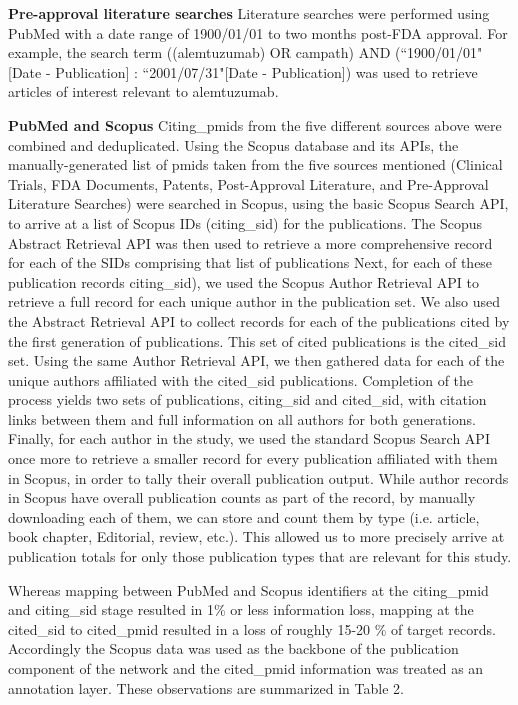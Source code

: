\documentclass[10pt,letterpaper]{article}
\begin{document}
\textbf{Pre-approval literature searches} Literature searches were performed using PubMed with a date range of 1900/01/01 to two months post-FDA approval. For example, the search term ((alemtuzumab) OR campath) AND (``1900/01/01"[Date - Publication] : ``2001/07/31"[Date - Publication]) was used to retrieve articles of interest relevant to alemtuzumab.

\textbf{PubMed and Scopus} Citing\_pmids from the five different sources above  were combined and deduplicated. Using the Scopus database and its APIs, the manually-generated list of pmids taken from the five sources mentioned (Clinical Trials, FDA Documents, Patents, Post-Approval Literature, and Pre-Approval Literature Searches) were searched in Scopus, using the basic Scopus Search API, to arrive at a list of Scopus IDs (citing\_sid) for the publications. The Scopus Abstract Retrieval API was then used to retrieve a more comprehensive record for each of the SIDs comprising that list of publications Next, for each of these publication records citing\_sid), we used the Scopus Author Retrieval API to retrieve a full record for each unique author in the  publication set. We also used the Abstract Retrieval API to collect records for each of the publications cited by the first generation of publications. This set of cited publications is the cited\_sid set.  Using the same Author Retrieval API, we then gathered data for each of the unique authors affiliated with the cited\_sid publications. Completion of the process yields two sets of publications, citing\_sid and cited\_sid, with citation links between them and full information on all authors for both generations. Finally, for each author in the study, we used the standard Scopus Search API once more to retrieve a smaller record for every publication affiliated with them in Scopus, in order to tally their overall publication output. While author records in Scopus have overall publication counts as part of the record, by manually downloading each of them, we can store and count them by type (i.e. article, book chapter, Editorial, review, etc.). This allowed us to more precisely arrive at publication totals for only those publication types that are relevant for this study. 

Whereas mapping between PubMed and Scopus identifiers at the citing\_pmid and citing\_sid stage resulted in 1\% or less information loss, mapping at the cited\_sid to cited\_pmid resulted in a loss of roughly 15-20 \% of target records. Accordingly the Scopus data  was used as the backbone of the publication component of the network and the cited\_pmid information was treated as an annotation layer.  These observations are summarized in Table 2. 
\end{document}
